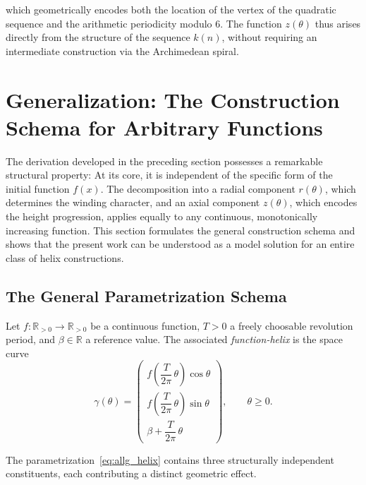 which geometrically encodes both the location of the vertex of the quadratic sequence and the
arithmetic periodicity modulo $6$. The function
$z(\theta)$ thus arises directly from the structure of the sequence
$k(n)$, without requiring an intermediate construction via the Archimedean spiral.

\section{Generalization: The Construction Schema for Arbitrary Functions}

The derivation developed in the preceding section possesses a
remarkable structural property: At its core, it is independent
of the specific form of the initial function $f(x)$. The decomposition into
a radial component $r(\theta)$, which determines the winding character,
and an axial component $z(\theta)$, which encodes the height progression, applies
equally to any continuous, monotonically increasing function. This section
formulates the general construction schema and shows that the present
work can be understood as a model solution for an entire class of helix constructions.

\subsection{The General Parametrization Schema}

\begin{definition}\label{def:funktionshelix}
Let $f: \mathbb{R}_{>0} \to \mathbb{R}_{>0}$ be a continuous function,
$T > 0$ a freely choosable revolution period, and $\beta \in \mathbb{R}$
a reference value. The associated \emph{function-helix} is the
space curve
\begin{equation}
\label{eq:allg_helix}
\gamma(\theta)
=
\begin{pmatrix}
f\!\left(\dfrac{T}{2\pi}\,\theta\right)\cos\theta\\[8pt]
f\!\left(\dfrac{T}{2\pi}\,\theta\right)\sin\theta\\[8pt]
\beta + \dfrac{T}{2\pi}\,\theta
\end{pmatrix},
\qquad \theta \geq 0.
\end{equation}
\end{definition}

The parametrization~\eqref{eq:allg_helix} contains three structurally
independent constituents, each contributing a distinct
geometric effect.

